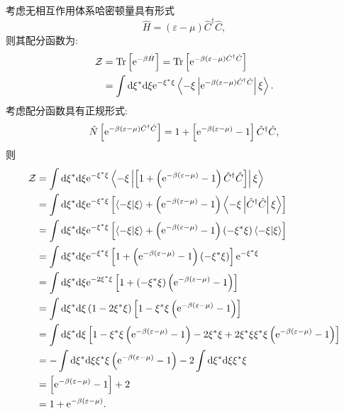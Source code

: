 考虑无相互作用体系哈密顿量具有形式
\begin{equation}
\hat{H}=(\varepsilon-\mu)\hat{C}^{\dagger}\hat{C},
\end{equation}
则其配分函数为:
\begin{align}
\mathcal{Z}&=\operatorname{Tr}\left[\mathrm{e}^{-\beta \hat{H}}\right]=\operatorname{Tr}\left[\mathrm{e}^{-\beta(\varepsilon-\mu)\hat{C}^{\dagger} \hat{C}} \right]\nonumber\\
&=\int \mathrm{d} \xi^{*} \mathrm{d} \xi \mathrm{e}^{-\xi^{*} \xi}\left\langle-\xi\left|\mathrm{e}^{-\beta(\varepsilon-\mu) \hat{C}^{\dagger} \hat{C}}\right| \xi\right\rangle.
\end{align}
考虑配分函数具有正规形式:
\begin{equation}
\hat N\left[\mathrm{e}^{-\beta(\varepsilon-\mu)\hat{C}^{\dagger} \hat{C}} \right]=1+\left[\mathrm{e}^{-\beta(\varepsilon-\mu)} -1\right]\hat{C}^{\dagger} \hat{C},
\end{equation}
则
\begin{align}
\mathcal{Z}&=\int \mathrm{d} \xi^{*} \mathrm{d} \xi \mathrm{e}^{{-\xi^{*} \xi}}\left\langle-\xi\left|\left[1+\left(\mathrm{e}^{-\beta(\varepsilon-\mu)}-1\right) \hat{C}^{\dagger} \hat{C}\right]\right| \xi\right\rangle\nonumber\\
&=\int \mathrm{d} \xi^{*} \mathrm{d} \xi \mathrm{e}^{-\xi^{*} \xi}\left[\langle -\xi | \xi\rangle+\left(\mathrm{e}^{-\beta(\varepsilon-\mu)}-1\right)\left\langle-\xi\left| \hat{C}^{\dagger} \hat{C} \right| \xi\right\rangle\right]\nonumber\\
&=\int \mathrm{d} \xi^{*} \mathrm{d} \xi \mathrm{e}^{-\xi^{*} \xi}\left[\langle-\xi | \xi\rangle+\left(\mathrm{e}^{-\beta(\varepsilon-\mu)}-1\right)\left(-\xi^{*} \xi\right)\langle-\xi | \xi\rangle\right]\nonumber\\
&=\int \mathrm{d} \xi^{*} \mathrm{d} \xi \mathrm{e}^{-\xi^{*} \xi}\left[1+\left(\mathrm{e}^{-\beta(\varepsilon-\mu)}-1\right)\left(-\xi^{*} \xi\right)\right] \mathrm{e}^{-\xi^{*} \xi}\nonumber\\
&=\int \mathrm{d} \xi^{*} \mathrm{d} \xi \mathrm{e}^{-2 \xi^{*} \xi}\left[1+\left(-\xi^{*} \xi\right)\left(\mathrm{e}^{-\beta(\varepsilon-\mu)}-1\right)\right]\nonumber\\
&=\int \mathrm{d} \xi^{*} \mathrm{d} \xi\left(1-2 \xi^{*} \xi\right)\left[1-\xi^{*} \xi\left(\mathrm{e}^{-\beta(\varepsilon-\mu)}-1\right)\right]\nonumber\\
&=\int \mathrm{d} \xi^{*} \mathrm{d} \xi\left[1-\xi^{*} \xi\left(\mathrm{e}^{-\beta(\varepsilon-\mu)}-1\right)-2 \xi^{*} \xi+2 \xi^{*} \xi\xi^{*} \xi\left(\mathrm{e}^{-\beta(\varepsilon-\mu)}-1\right)\right]\nonumber\\
&=-\int \mathrm{d} \xi^{*} \mathrm{d} \xi \xi^{*} \xi\left(\mathrm{e}^{-\beta(\varepsilon-\mu)}-1\right)-2 \int \mathrm{d} \xi^{*} \mathrm{d} \xi \xi^{*} \xi \nonumber\\
&=\left[\mathrm{e}^{-\beta(\varepsilon-\mu)}-1\right]+2\nonumber\\
&=1+\mathrm{e}^{-\beta(\varepsilon-\mu)}.
\end{align}
